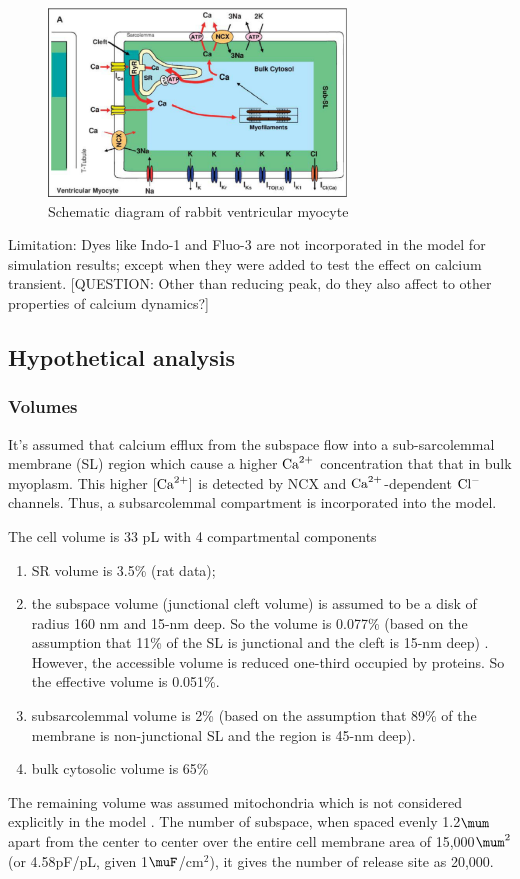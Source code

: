 \begin{figure}[hbt]
  \centerline{\includegraphics[height=5cm,
    angle=0]{./images/shannon_04_rabbit.eps}}
  \caption{Schematic diagram of rabbit ventricular myocyte}
  \label{fig:shannon04_rabbit}
\end{figure}

Limitation: Dyes like Indo-1 and Fluo-3 are not incorporated in the model for
simulation results; except when they were added to test the effect on calcium
transient. [QUESTION: Other than reducing peak, do they also affect to other
properties of calcium dynamics?]


\subsection{Hypothetical analysis}

\subsubsection{Volumes}

It's assumed that calcium efflux from the subspace flow into a sub-sarcolemmal
membrane (SL) region which cause a higher ${\text{Ca}^{2+}}$ concentration that that in bulk
myoplasm. This higher $[{\text{Ca}^{2+}}]$ is detected by NCX and ${\text{Ca}^{2+}}$-dependent ${\text{Cl}^{-}}$
channels. Thus, a subsarcolemmal compartment is incorporated into the model.

The cell volume is 33 pL with 4 compartmental components
\begin{enumerate}
  \item SR volume is 3.5\% \citep{page1971} (rat data);
  \item the subspace volume (junctional cleft volume) is assumed to be a disk of
  radius 160 nm and 15-nm deep. So the volume is 0.077\% (based on the
  assumption that 11\% of the SL is junctional and the cleft is 15-nm deep)
  \citep{page1979, soeller1997}. However, the accessible volume is reduced
  one-third occupied by proteins. So the effective volume is 0.051\%.

  \item subsarcolemmal volume is 2\% (based on the assumption that 89\% of the
  membrane is non-junctional SL and the region is 45-nm deep).
  \item bulk cytosolic volume is 65\%
\end{enumerate}
The remaining volume was assumed mitochondria which is not
considered explicitly in the model \citep{page1971}. The number of subspace,
when spaced evenly 1.2$\mum$ apart from the center to center over the entire
cell membrane area of 15,000$\mum^2$ (or 4.58pF/pL, given 1$\muF$/cm$^2$), it
gives the number of release site as 20,000.



